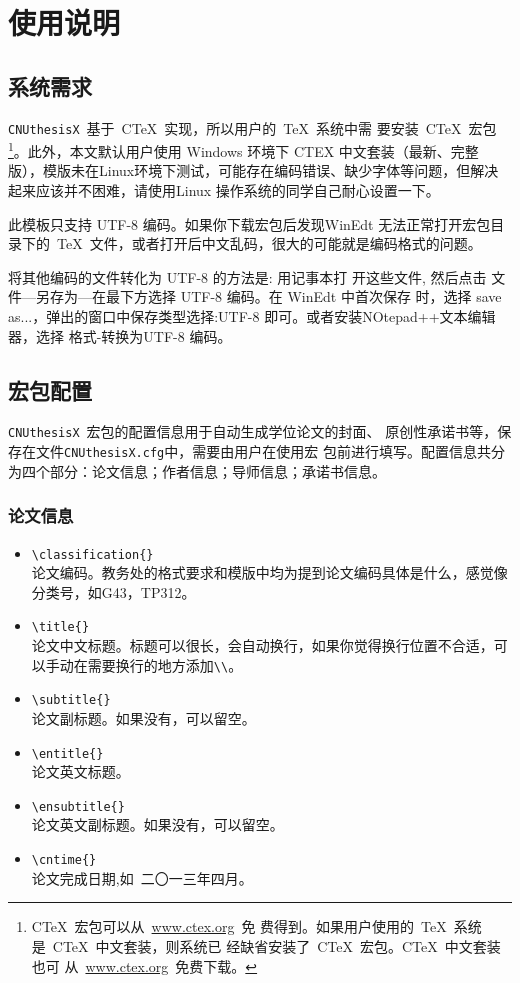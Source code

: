 ﻿
\chapter{使用说明}

\section{系统需求}

\texttt{CNUthesisX}~基于~C\TeX~实现，所以用户的~\TeX~系统中需
要安装~C\TeX~宏包\footnote{C\TeX~宏包可以从~\url{www.ctex.org}~免
费得到。如果用户使用的~\TeX~系统是~C\TeX~中文套装，则系统已
经缺省安装了~C\TeX~宏包。C\TeX~中文套装也可
从~\url{www.ctex.org}~免费下载。}。此外，本文默认用户使用 Windows 环境下 CTEX 中文套装（最新、完整版），模版未在Linux环境下测试，可能存在编码错误、缺少字体等问题，但解决起来应该并不困难，请使用Linux 操作系统的同学自己耐心设置一下。

此模板只支持 UTF-8 编码。如果你下载宏包后发现WinEdt 无法正常打开宏包目录下的~\TeX~文件，或者打开后中文乱码，很大的可能就是编码格式的问题。

将其他编码的文件转化为 UTF-8 的方法是: 用记事本打
开这些文件, 然后点击 文件—另存为—在最下方选择 UTF-8 编码。在 WinEdt 中首次保存
时，选择 save as...，弹出的窗口中保存类型选择:UTF-8 即可。或者安装NOtepad++文本编辑器，选择 格式-转换为UTF-8 编码。



\section{宏包配置}
\label{section:cfg}

\texttt{CNUthesisX}~宏包的配置信息用于自动生成学位论文的封面、
原创性承诺书等，保存在文件\texttt{CNUthesisX.cfg}中，需要由用户在使用宏
包前进行填写。配置信息共分为四个部分：论文信息；作者信息；导师信息；承诺书信息。
\subsection{论文信息}
\begin{itemize}
\item \verb|\classification{}|\\
论文编码。教务处的格式要求和模版中均为提到论文编码具体是什么，感觉像分类号，如G43，TP312。
\item \verb|\title{}|\\
	论文中文标题。标题可以很长，会自动换行，如果你觉得换行位置不合适，可以手动在需要换行的地方添加\verb|\\|。
\item \verb|\subtitle{}|\\
	论文副标题。如果没有，可以留空。
\item \verb|\entitle{}|\\
	论文英文标题。
\item \verb|\ensubtitle{}|\\
	论文英文副标题。如果没有，可以留空。
\item \verb|\cntime{}|\\
	论文完成日期,如~二〇一三年四月。
\end{itemize}
